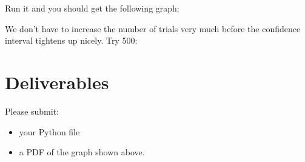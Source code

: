 \begin{fullwidth}
\step Run it and you should get the following graph:


\step  We don't have to increase the number of trials very much before the confidence interval tightens up nicely. Try 500:


\section{Deliverables}

Please submit:

\begin{itemize}
\item your Python file
\item a PDF of the graph shown above.
\end{itemize}

\end{fullwidth}

